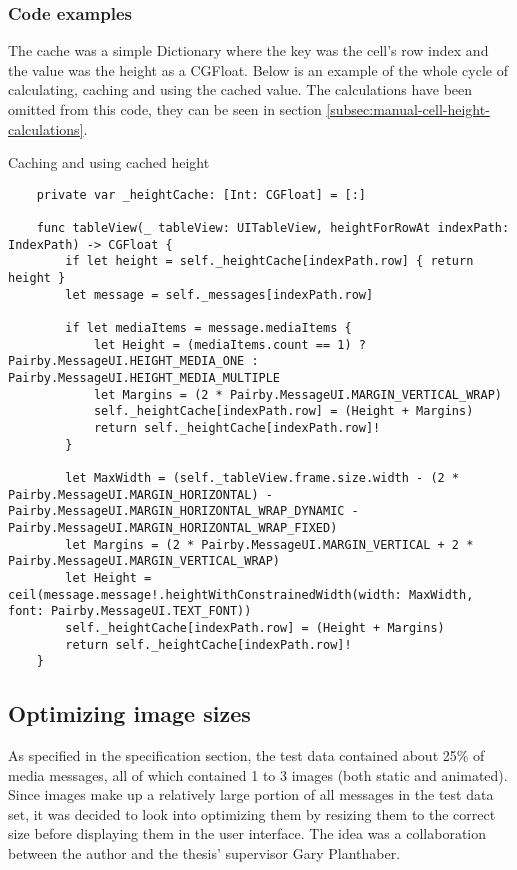 \documentclass[a4paper,12pt]{article}
\begin{document}
\subsubsection{Code examples}
The cache was a simple Dictionary where the key was the cell's row index and the value was the height as a CGFloat. Below is an example of the whole cycle of calculating, caching and using the cached value. The calculations have been omitted from this code, they can be seen in section \ref{subsec:manual-cell-height-calculations}. 
\begin{listing}[H]
  \caption{Caching and using cached height}
  \begin{verbatim}
    private var _heightCache: [Int: CGFloat] = [:]

    func tableView(_ tableView: UITableView, heightForRowAt indexPath: IndexPath) -> CGFloat {
        if let height = self._heightCache[indexPath.row] { return height }
        let message = self._messages[indexPath.row]

        if let mediaItems = message.mediaItems {
            let Height = (mediaItems.count == 1) ? Pairby.MessageUI.HEIGHT_MEDIA_ONE : Pairby.MessageUI.HEIGHT_MEDIA_MULTIPLE
            let Margins = (2 * Pairby.MessageUI.MARGIN_VERTICAL_WRAP)
            self._heightCache[indexPath.row] = (Height + Margins)
            return self._heightCache[indexPath.row]!
        }

        let MaxWidth = (self._tableView.frame.size.width - (2 * Pairby.MessageUI.MARGIN_HORIZONTAL) - Pairby.MessageUI.MARGIN_HORIZONTAL_WRAP_DYNAMIC - Pairby.MessageUI.MARGIN_HORIZONTAL_WRAP_FIXED)
        let Margins = (2 * Pairby.MessageUI.MARGIN_VERTICAL + 2 * Pairby.MessageUI.MARGIN_VERTICAL_WRAP)
        let Height = ceil(message.message!.heightWithConstrainedWidth(width: MaxWidth, font: Pairby.MessageUI.TEXT_FONT))
        self._heightCache[indexPath.row] = (Height + Margins)
        return self._heightCache[indexPath.row]!
    }
  \end{verbatim}
\end{listing}


\subsection{Optimizing image sizes}
\label{sec:optimizing-image-sizes}
As specified in the specification section, the test data contained about 25\% of media messages, all of which contained 1 to 3 images (both static and animated). Since images make up a relatively large portion of all messages in the test data set, it was decided to look into optimizing them by resizing them to the correct size before displaying them in the user interface. The idea was a collaboration between the author and the thesis' supervisor Gary Planthaber.
\end{document}
